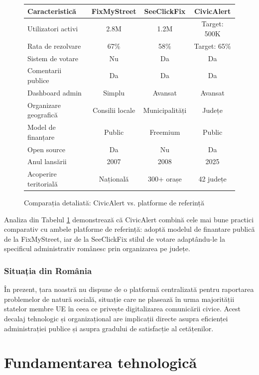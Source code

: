 \documentclass[12pt,a4paper]{report}
\begin{document}
\begin{figure}[H]
\centering
\begin{tabular}{|l|c|c|c|}
\hline
\textbf{Caracteristică} & \textbf{FixMyStreet} & \textbf{SeeClickFix} & \textbf{CivicAlert} \\
\hline
Utilizatori activi & 2.8M & 1.2M & Target: 500K \\
\hline
Rata de rezolvare & 67\% & 58\% & Target: 65\% \\
\hline
Sistem de votare & Nu & Da & Da \\
\hline
Comentarii publice & Da & Da & Da \\
\hline
Dashboard admin & Simplu & Avansat & Avansat \\
\hline
Organizare geografică & Consilii locale & Municipalități & Județe \\
\hline
Model de finanțare & Public & Freemium & Public \\
\hline
Open source & Da & Nu & Da \\
\hline
Anul lansării & 2007 & 2008 & 2025 \\
\hline
Acoperire teritorială & Națională & 300+ orașe & 42 județe \\
\hline
\end{tabular}
\caption{Comparația detaliată: CivicAlert vs. platforme de referință}
\label{tab:comparatie_detaliata}
\end{figure}

Analiza din Tabelul \ref{tab:comparatie_detaliata} demonstrează că CivicAlert combină cele mai bune practici comparativ cu  ambele platforme de referință: adoptă modelul de finantare publică de la FixMyStreet, iar  de la SeeClickFix stilul de votare  adaptându-le la specificul administrativ românesc prin organizarea pe județe.

\subsection{Situația din România}

În prezent, țara noastră nu dispune de o platformă centralizată pentru raportarea problemelor de natură socială, situație care ne plasează  în urma majorității statelor membre UE în ceea ce privește digitalizarea comunicării civice. Acest decalaj tehnologic și organizațional are implicații directe asupra eficienței administrației publice și asupra gradului de satisfacție al cetățenilor.

\chapter{Fundamentarea tehnologică}
\end{document}
